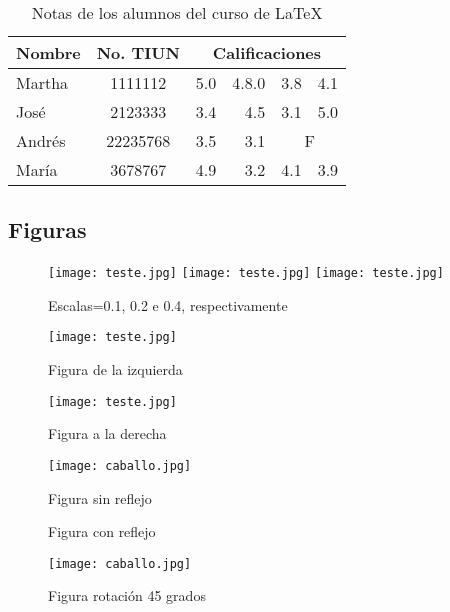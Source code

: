 \documentclass{article}
\begin{document}
\begin{center}
\def\tablename{Tabla}%
\begin{table}[!htb]
\centering
\caption{Notas de los alumnos del curso de \LaTeX } \vspace*{0.3cm}
\begin{sideways}
\begin{tabular}{l|c|rrrr} \hline
Nombre & No. TIUN  & \multicolumn{4}{c}{Calificaciones} \\ \hline
Martha & 1111112 & 5.0 & 4.8.0 & 3.8 & 4.1 \\
José & 2123333   & 3.4 & 4.5 & 3.1 & 5.0 \\
Andrés & 22235768 & 3.5 & 3.1 & \multicolumn{2}{c}{F} \\
María & 3678767 & 4.9 & 3.2& 4.1 & 3.9 \\ \hline
\end{tabular}
\end{sideways}
\end{table}
\end{center}

\subsection{Figuras}

\begin{figure}[H]
\centering
\texttt{[image: teste.jpg]}
\texttt{[image: teste.jpg]}
\texttt{[image: teste.jpg]}
\caption{Escalas=0.1, 0.2 e 0.4, respectivamente}
\end{figure}

\begin{figure}[!htb]
\begin{minipage}[b]{0.40\linewidth}
\texttt{[image: teste.jpg]}
\caption{Figura de la izquierda}
\label{fig1}
\end{minipage} \hfill
\begin{minipage}[b]{0.40\linewidth}
\texttt{[image: teste.jpg]}
\caption{Figura a la derecha}
\label{fig2}
\end{minipage}
\end{figure}


\begin{figure}[!htb]
\begin{minipage}[b]{0.40\linewidth}
\texttt{[image: caballo.jpg]}
\caption{Figura sin reflejo}
\label{fig4}
\end{minipage} \hfill
\begin{minipage}[b]{0.40\linewidth}
\caption{Figura con reflejo}
\label{fig5}
\end{minipage}
\end{figure}

\begin{figure}[!htb]
\texttt{[image: caballo.jpg]}
\caption{Figura rotación 45 grados}
\label{Aviao}
\end{figure}
\end{document}
